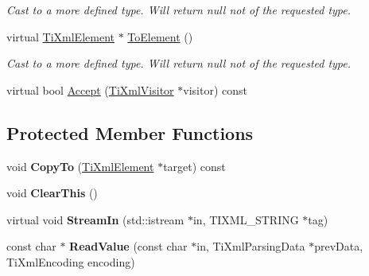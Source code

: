 \begin{DoxyCompactItemize}
\begin{DoxyCompactList}\small\item\em Cast to a more defined type. Will return null not of the requested type. \item\end{DoxyCompactList}\item 
\hypertarget{class_ti_xml_element_a9def86337ea7a755eb41cac980f60c7a}{
virtual \hyperlink{class_ti_xml_element}{TiXmlElement} $\ast$ \hyperlink{class_ti_xml_element_a9def86337ea7a755eb41cac980f60c7a}{ToElement} ()}
\label{class_ti_xml_element_a9def86337ea7a755eb41cac980f60c7a}

\begin{DoxyCompactList}\small\item\em Cast to a more defined type. Will return null not of the requested type. \item\end{DoxyCompactList}\item 
virtual bool \hyperlink{class_ti_xml_element_a71a81b2afb0d42be1543d1c404dee6f5}{Accept} (\hyperlink{class_ti_xml_visitor}{TiXmlVisitor} $\ast$visitor) const 
\end{DoxyCompactItemize}
\subsection*{Protected Member Functions}
\begin{DoxyCompactItemize}
\item 
\hypertarget{class_ti_xml_element_a9e0c1983b840de4134f1f6bf7af00b0f}{
void {\bfseries CopyTo} (\hyperlink{class_ti_xml_element}{TiXmlElement} $\ast$target) const }
\label{class_ti_xml_element_a9e0c1983b840de4134f1f6bf7af00b0f}

\item 
\hypertarget{class_ti_xml_element_a5670933ec2d7d9763b9891acc05d7f7d}{
void {\bfseries ClearThis} ()}
\label{class_ti_xml_element_a5670933ec2d7d9763b9891acc05d7f7d}

\item 
\hypertarget{class_ti_xml_element_acc42052299e0bcf04871f3c2d229fe93}{
virtual void {\bfseries StreamIn} (std::istream $\ast$in, TIXML\_\-STRING $\ast$tag)}
\label{class_ti_xml_element_acc42052299e0bcf04871f3c2d229fe93}

\item 
\hypertarget{class_ti_xml_element_ad072ea0e78226a52f0a3872fa03bc29c}{
const char $\ast$ {\bfseries ReadValue} (const char $\ast$in, TiXmlParsingData $\ast$prevData, TiXmlEncoding encoding)}
\label{class_ti_xml_element_ad072ea0e78226a52f0a3872fa03bc29c}

\end{DoxyCompactItemize}


